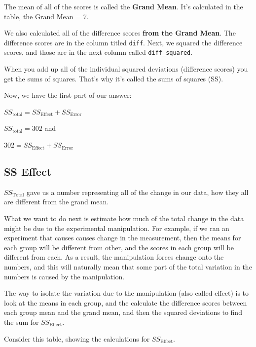 \documentclass[
  letterpaper,
  DIV=11,
  numbers=noendperiod]{scrreprt}
\begin{document}
The mean of all of the scores is called the \textbf{Grand Mean}. It's
calculated in the table, the Grand Mean = 7.

We also calculated all of the difference scores \textbf{from the Grand
Mean}. The difference scores are in the column titled \texttt{diff}.
Next, we squared the difference scores, and those are in the next column
called \texttt{diff\_squared}.

When you add up all of the individual squared deviations (difference
scores) you get the sums of squares. That's why it's called the sums of
squares (SS).

Now, we have the first part of our answer:

\(SS_\text{total} = SS_\text{Effect} + SS_\text{Error}\)

\(SS_\text{total} = 302\) and

\(302 = SS_\text{Effect} + SS_\text{Error}\)

\subsection{SS Effect}\label{ss-effect-1}

\(SS_\text{Total}\) gave us a number representing all of the change in
our data, how they all are different from the grand mean.

What we want to do next is estimate how much of the total change in the
data might be due to the experimental manipulation. For example, if we
ran an experiment that causes causes change in the measurement, then the
means for each group will be different from other, and the scores in
each group will be different from each. As a result, the manipulation
forces change onto the numbers, and this will naturally mean that some
part of the total variation in the numbers is caused by the
manipulation.

The way to isolate the variation due to the manipulation (also called
effect) is to look at the means in each group, and the calculate the
difference scores between each group mean and the grand mean, and then
the squared deviations to find the sum for \(SS_\text{Effect}\).

Consider this table, showing the calculations for \(SS_\text{Effect}\).
\end{document}
